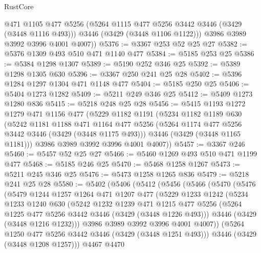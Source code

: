 \begin{lexlean}{RustCore}
\begin{coremodule}
          @471
          @1105
          @477
          @5256
          (@5264 @1115 @477 @5256 @3442 @3446 (@3429 (@3448 @1116 @493)))
          @3446
          (@3429 (@3448 @1106 @1122)))
        @3986
        @3989
        @3992
        @3996
        @4001
        @4007))
@5376 := @3367 @253 @52 @25 @27
@5382 := @5376 @1309 @493 @510 @471 @1140 @477
@5384 := @5185 @253 @25
@5386 := @5384 @1298 @1307
@5389 := @5190 @252 @346 @25
@5392 := @5389 @1298 @1305 @630
@5396 := @3367 @250 @241 @25 @28
@5402 := @5396 @1284 @1297 @1304 @471 @1148 @477
@5404 := @5185 @250 @25
@5406 := @5404 @1273 @1282
@5409 := @5211 @249 @346 @25
@5412 := @5409 @1273 @1280 @836
@5415 := @5218 @248 @25 @28
@5456 := @5415
    @1193
    @1272
    @1279
    @471
    @1156
    @477
    (@5229
      @1182
      @1191
      (@5234
        @1182
        @1189
        @630
        (@5242
          @1181
          @1188
          @471
          @1164
          @477
          @5256
          (@5264 @1174 @477 @5256 @3442 @3446 (@3429 (@3448 @1175 @493)))
          @3446
          (@3429 (@3448 @1165 @1181)))
        @3986
        @3989
        @3992
        @3996
        @4001
        @4007))
@5457 := @3367 @246
@5460 := @5457 @52 @25 @27
@5466 := @5460 @1269 @493 @510 @471 @1199 @477
@5468 := @5185 @246 @25
@5470 := @5468 @1258 @1267
@5473 := @5211 @245 @346 @25
@5476 := @5473 @1258 @1265 @836
@5479 := @5218 @241 @25 @28
@5580 := @5402
    (@5406
      (@5412
        (@5456
          (@5466
            (@5470
              (@5476
                (@5479
                  @1244
                  @1257
                  @1264
                  @471
                  @1207
                  @477
                  (@5229
                    @1233
                    @1242
                    (@5234
                      @1233
                      @1240
                      @630
                      (@5242
                        @1232
                        @1239
                        @471
                        @1215
                        @477
                        @5256
                        (@5264 @1225 @477 @5256 @3442 @3446 (@3429 (@3448 @1226 @493)))
                        @3446
                        (@3429 (@3448 @1216 @1232)))
                      @3986
                      @3989
                      @3992
                      @3996
                      @4001
                      @4007))
                  (@5264 @1250 @477 @5256 @3442 @3446 (@3429 (@3448 @1251 @493)))
                  @3446
                  (@3429 (@3448 @1208 @1257)))
                @4467
                @4470

\end{coremodule}
\end{lexlean}
